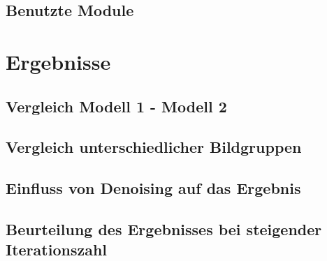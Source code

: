 		\subsection{Benutzte Module}
		\label{sub:used-modules}
		
	\section{Ergebnisse}
	\label{sec:results}
	
		\subsection{Vergleich Modell 1 - Modell 2}
		\label{sub:comp-m1-m2}
		
		\subsection{Vergleich unterschiedlicher Bildgruppen}
		\label{sub:comp-diff-images}
		
		\subsection{Einfluss von Denoising auf das Ergebnis}
		\label{sub:influence-of-denoising}
		
		\subsection{Beurteilung des Ergebnisses bei steigender Iterationszahl}
		\label{sub:judging-higher-iteration}